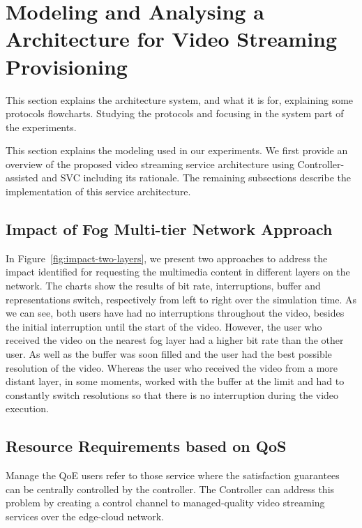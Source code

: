 \section{Modeling and Analysing a Architecture for Video Streaming Provisioning}
\label{sec:system-archi}

{\color{blue} This section explains the architecture system, and what it is  for, explaining some protocols flowcharts. Studying the protocols and focusing in the system part of the experiments.}

This section explains the modeling used in our experiments. We first provide an overview of the proposed video streaming service architecture using Controller-assisted and SVC including its rationale. The remaining subsections describe the implementation of this service architecture.

\subsection{Impact of Fog Multi-tier Network Approach}

In Figure~\ref{fig:impact-two-layers}, we present two approaches to address the impact identified for requesting the multimedia content in different layers on the network. The charts show the results of bit rate, interruptions, buffer and representations switch, respectively from left to right over the simulation time. As we can see, both users have had no interruptions throughout the video, besides the initial interruption until the start of the video. However, the user who received the video on the nearest fog layer had a higher bit rate than the other user. As well as the buffer was soon filled and the user had the best possible resolution of the video. Whereas the user who received the video from a more distant layer, in some moments, worked with the buffer at the limit and had to constantly switch resolutions so that there is no interruption during the video execution.

\subsection{Resource Requirements based on QoS}

Manage the QoE users refer to those service where the satisfaction guarantees can be centrally controlled by the controller. The Controller can address this problem by creating a control channel to managed-quality video streaming services over the edge-cloud network.


